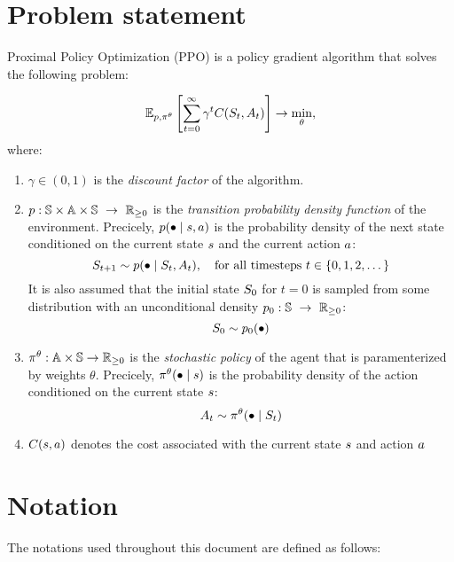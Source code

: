 \documentclass[12pt,twoside]{../../mitthesis}
\begin{document}
\section*{Problem statement}
Proximal Policy Optimization (PPO) is a policy gradient algorithm that solves the following problem:

\begin{equation}
    \label{eqn_ppo_problem}
    \E[\transit, \policy^{\theta}]{\sum_{t = 0}^{\infty} \gamma ^ t \Cost(\State_{t}, \Action_{t})} \ra \min_{\theta},
\end{equation}
where:
\begin{enumerate}
    \item $\gamma \in (0, 1)$ is the \textit{discount factor} of the algorithm. 
    \item  $p : \mathbb S \times \mathbb A \times \mathbb S \ \rightarrow \ {\mathbb{R}}_{\geq 0}$ is the \textit{transition probability density function} of the environment. Precicely, $p(\bullet \mid s, a)$ is the probability density of the next state conditioned on the current state $s$ and the current action $a$:
    $$
        S_{t+1} \sim p(\bullet \mid S_t, A_t), \quad \text{for all timesteps } t \in \{0, 1, 2,\dots\} 
    $$
    It is also assumed that the initial state $S_0$ for $t = 0$ is sampled from some distribution with an unconditional density $p_0 : \mathbb S \ \rightarrow \ {\mathbb{R}}_{\geq 0}$:
    $$
        S_0 \sim p_0(\bullet)
    $$
    \item $\pi^{\theta} : \mathbb A \times \mathbb S \rightarrow {\mathbb{R}}_{\geq 0}$ is the \textit{stochastic policy} of the agent that is paramenterized by weights $\theta$. Precicely, $\pi^{\theta}(\bullet \mid s)$ is the probability density of the action conditioned on the current state $s$:
    $$
        A_t \sim \pi^{\theta}(\bullet \mid S_t)
    $$
    \item $C(s, a)$ denotes the cost associated with the current state $s$ and action $a$
\end{enumerate}

\section*{Notation}

The notations used throughout this document are defined as follows:
\end{document}
